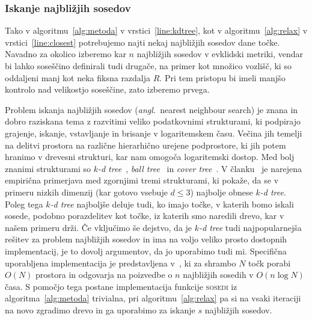 \documentclass[12pt,a4paper,twoside]{article}
\theoremstyle{definition} %
\theoremstyle{plain} %
\numberwithin{equation}{section}
\newcommand{\ang}[1]{(\textit{angl.}\ #1)}
\begin{document}
\subsubsection{Iskanje najbližjih sosedov}

Tako v algoritmu~\ref{alg:metoda} v vrstici~\ref{line:kdtree}, kot v
algoritmu~\ref{alg:relax} v vrstici~\ref{line:closest} potrebujemo
najti nekaj najbližjih sosedov dane točke. Navadno za okolico izberemo kar
$n$ najbližjih sosedov v evklidski metriki, vendar bi lahko soseščino definirali
tudi drugače, na primer kot množico vozlišč, ki so oddaljeni manj kot neka
fiksna razdalja $R$.  Pri tem pristopu bi imeli manjšo kontrolo nad velikostjo
soseščine, zato izberemo prvega.

Problem iskanja najbližjih sosedov \ang{nearest neighbour search} je znana in
dobro raziskana tema z razvitimi veliko podatkovnimi strukturami, ki podpirajo
grajenje, iskanje, vstavljanje in brisanje v logaritemskem času. Večina jih
temelji na delitvi prostora na različne hierarhično urejene podprostore, ki jih
potem hranimo v drevesni strukturi, kar nam omogoča logaritemski dostop. Med
bolj znanimi strukturami so \emph{$k$-d tree}~\cite{moore1991intoductory},
\emph{ball tree}~\cite{omohundro1989five} in \emph{cover
tree}~\cite{beygelzimer2006cover}. V članku~\cite{kibriya2007empirical} je
narejena empirična primerjava med zgornjimi tremi strukturami, ki pokaže, da
se v primeru nizkih dimenzij (kar gotovo vsebuje $d \leq 3$) najbolje obnese
\emph{$k$-d tree}. Poleg tega \emph{$k$-d tree} najboljše deluje tudi, ko imajo
točke, v katerih bomo iskali sosede, podobno porazdelitev kot točke, iz katerih
smo naredili drevo, kar v našem primeru drži. Če vključimo še dejstvo, da je
\emph{$k$-d tree} tudi najpopularnejša rešitev za problem najbližjih sosedov
in ima na voljo veliko prosto dostopnih implementacij, je to dovolj argumentov,
da jo uporabimo tudi mi. Specifična uporabljena implementacija je predstavljena
v~\cite{mount1998ann}, ki za shrambo $N$ točk porabi $O(N)$ prostora in
odgovarja na poizvedbe o $n$ najbližjih sosedih v $O(n\log N)$ časa.
S pomočjo tega postane implementacija funkcije \textsc{sosedi} iz
algoritma~\ref{alg:metoda} trivialna, pri algoritmu~\ref{alg:relax} pa si na
vsaki iteraciji na novo zgradimo drevo in ga uporabimo za iskanje $s$ najbližjih
sosedov.
\end{document}
